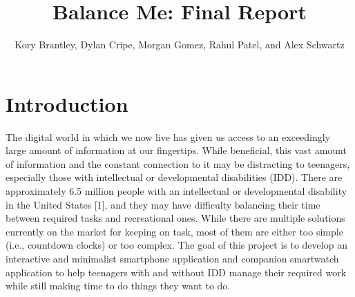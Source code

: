 \documentclass{sigchi}
\def\plaintitle{Balance Me: Final Report}
\def\plainauthor{Kory Brantley, Dylan Cripe, Morgan Gomez, Rahul Patel,
and Alex Schwartz}
\begin{document}
\title{\plaintitle}

\author{
\plainauthor
}

\maketitle

\section{Introduction}

The digital world in which we now live has given us access to an exceedingly
large amount of information at our fingertips. While beneficial, this vast
amount of information and the constant connection to it may be distracting to
teenagers, especially those with intellectual or developmental disabilities
(IDD). There are approximately 6.5 million people with an intellectual or
developmental disability in the United States [1], and they may have difficulty
balancing their time between required tasks and recreational ones. While there
are multiple solutions currently on the market for keeping on task, most of
them are either too simple (i.e., countdown clocks) or too complex. The goal of
this project is to develop an interactive and minimalist smartphone application
and companion smartwatch application to help teenagers with and without IDD
manage their required work while still making time to do things they want to do.
\end{document}
